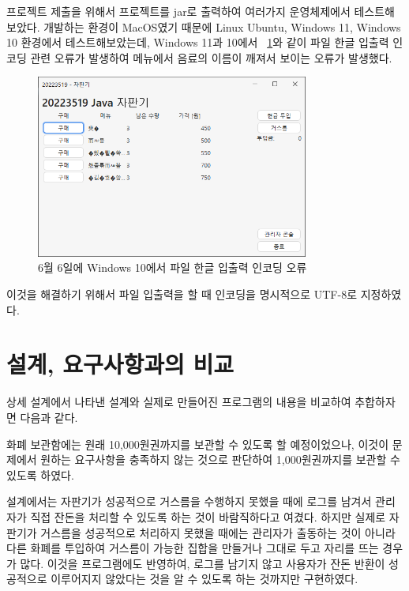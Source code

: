 \documentclass{oblivoir}
\newcommand{\figref}[1]{\figurename~\ref{#1}}
\begin{document}
    프로젝트 제출을 위해서 프로젝트를 jar로 출력하여 여러가지 운영체제에서 테스트해보았다.
    개발하는 환경이 MacOS였기 때문에 Linux Ubuntu, Windows 11, Windows 10 환경에서 테스트해보았는데,
    Windows 11과 10에서 \figref{fig:0606-windows}와 같이 파일 한글 입출력 인코딩 관련 오류가 발생하여 메뉴에서 음료의 이름이
    깨져서 보이는 오류가 발생했다.

    \begin{figure}[h]
        \centering
        \includegraphics[width=0.8\textwidth]{images/dev-snapshop/0606-windows}
        \caption{6월 6일에 Windows 10에서 파일 한글 입출력 인코딩 오류}
        \label{fig:0606-windows}
    \end{figure}

    이것을 해결하기 위해서 파일 입출력을 할 때 인코딩을 명시적으로 UTF-8로 지정하였다.

    \section{설계, 요구사항과의 비교}

    상세 설계에서 나타낸 설계와 실제로 만들어진 프로그램의 내용을 비교하여 추합하자면 다음과 같다.

    화폐 보관함에는 원래 10,000원권까지를 보관할 수 있도록 할 예정이었으나,
    이것이 문제에서 원하는 요구사항을 충족하지 않는 것으로 판단하여 1,000원권까지를 보관할 수 있도록 하였다.

    설계에서는 자판기가 성공적으로 거스름을 수행하지 못했을 때에
    로그를 남겨서 관리자가 직접 잔돈을 처리할 수 있도록 하는 것이 바람직하다고 여겼다.
    하지만 실제로 자판기가 거스름을 성공적으로 처리하지 못했을 때에는
    관리자가 출동하는 것이 아니라 다른 화폐를 투입하여 거스름이 가능한 집합을 만들거나
    그대로 두고 자리를 뜨는 경우가 많다.
    이것을 프로그램에도 반영하여,
    로그를 남기지 않고 사용자가 잔돈 반환이 성공적으로 이루어지지 않았다는 것을
    알 수 있도록 하는 것까지만 구현하였다.
\end{document}

